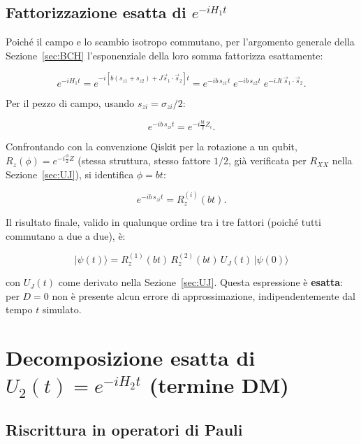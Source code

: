 \documentclass[11pt,a4paper]{article}
\newcommand{\ket}[1]{\lvert #1 \rangle}
\begin{document}
\subsection{Fattorizzazione esatta di $e^{-iH_1t}$}

Poiché il campo e lo scambio isotropo commutano, per l'argomento generale della Sezione~\ref{sec:BCH} l'esponenziale della loro somma fattorizza esattamente:

\begin{equation}
e^{-iH_1t} = e^{-i\left[b(s_{z1}+s_{z2})+J\vec s_1\cdot\vec s_2\right]t} = e^{-ib\,s_{z1}t}\;e^{-ib\,s_{z2}t}\;e^{-iJt\,\vec s_1\cdot\vec s_2}.
\end{equation}

Per il pezzo di campo, usando $s_{zi}=\sigma_{zi}/2$:

\begin{equation}
e^{-ib\,s_{zi}t} = e^{-i\frac{bt}{2}Z_i}.
\end{equation}

Confrontando con la convenzione Qiskit per la rotazione a un qubit, $R_z(\phi)=e^{-i\frac{\phi}{2}Z}$ (stessa struttura, stesso fattore $1/2$, già verificata per $R_{XX}$ nella Sezione~\ref{sec:UJ}), si identifica $\phi=bt$:

\begin{equation}
e^{-ib\,s_{zi}t} = R_z^{(i)}(bt).
\end{equation}

Il risultato finale, valido in qualunque ordine tra i tre fattori (poiché tutti commutano a due a due), è:

\begin{equation}
\boxed{\ket{\psi(t)} = R_z^{(1)}(bt)\,R_z^{(2)}(bt)\,U_J(t)\,\ket{\psi(0)}}
\end{equation}

con $U_J(t)$ come derivato nella Sezione~\ref{sec:UJ}. Questa espressione è \textbf{esatta}: per $D=0$ non è presente alcun errore di approssimazione, indipendentemente dal tempo $t$ simulato.

\section{Decomposizione esatta di $U_2(t) = e^{-iH_2t}$ (termine DM)}
\label{sec:U2}

\subsection{Riscrittura in operatori di Pauli}
\end{document}
